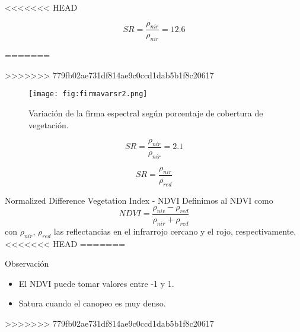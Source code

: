 <<<<<<< HEAD
\begin{frame}
\begin{equation}
    SR = \frac{\rho_{nir}}{\rho_{nir}} = 12.6
  \end{equation}
  \end{frame}
  
=======

>>>>>>> 779fb02ae731df814ae9c0ccd1dab5b1f8c20617
\begin{frame}{}
  \begin{figure}
    \centering
    \texttt{[image: fig:firmavarsr2.png]}
    \caption{Variación de la firma espectral según porcentaje de cobertura de vegetación.}
    \label{}
  \end{figure}
\end{frame}

\begin{frame}
\begin{equation}
    SR = \frac{\rho_{nir}}{\rho_{nir}} = 2.1
  \end{equation}
  \end{frame}

\begin{frame}
\begin{equation}
    SR = \frac{\rho_{nir}}{\rho_{red}}
  \end{equation}
  \end{frame}

\begin{frame}{}
\begin{block}{Normalized Difference Vegetation Index - NDVI}
  Definimos al NDVI como
  \begin{equation}
    NDVI = \frac{\rho_{nir}-\rho_{red}}{\rho_{nir}+\rho_{red}}
  \end{equation}
  con $\rho_{nir}$, $\rho_{red}$ las reflectancias en el infrarrojo cercano y el rojo, respectivamente.
<<<<<<< HEAD
=======
\end{block}\pause
\begin{block}{Observación}
    \begin{itemize}
        \item El NDVI puede tomar valores entre -1 y 1.
        \item Satura cuando el canopeo es muy denso.
    \end{itemize}
>>>>>>> 779fb02ae731df814ae9c0ccd1dab5b1f8c20617
\end{block}
\end{frame}

